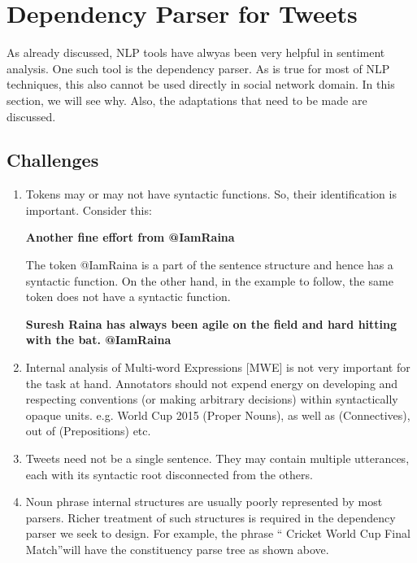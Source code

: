 \section{Dependency Parser for Tweets}

As already discussed, NLP tools have alwyas been very helpful in sentiment analysis. One such tool is the dependency parser. As is true for most of NLP techniques, this also
cannot be used directly in social network domain. In this section, we will see why. Also, the adaptations that need to be made are discussed. \cite{tweebo}

\subsection{Challenges}

\begin{enumerate}
\setlength{\itemsep}{15pt}
 \item Tokens may or may not have syntactic functions. So, their identification is important. Consider this:
 \vspace{8mm}
 
 \textbf{Another fine effort from @IamRaina}
 
 \vspace{8mm}
 
 The token @IamRaina is a part of the sentence structure and hence has a syntactic function. On the other hand, in the example to follow, the same token does not have a 
 syntactic function.  
 
 \vspace{8mm}
 
 \textbf{Suresh Raina has always been agile on the field and hard hitting with the bat. @IamRaina}
 
 \item Internal analysis of Multi-word Expressions [MWE] is not very important for the task at hand. Annotators should not expend energy on developing and respecting conventions (or making
arbitrary decisions) within syntactically opaque units. e.g. World Cup 2015 (Proper Nouns), as well as (Connectives), out of (Prepositions) etc.
\item Tweets need not be a single sentence. They may contain multiple utterances, each with its syntactic root
disconnected from the others.
\item Noun phrase internal structures are usually poorly represented by most parsers. Richer treatment of such structures is required in the dependency parser we seek
to design. For example, the phrase \textquotedblleft
Cricket World Cup Final Match\textquotedblright will have the constituency parse tree as shown above.


\end{enumerate}
